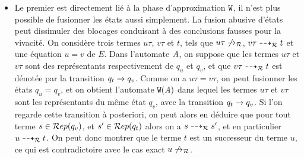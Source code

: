 \begin{itemize}
\item Le premier est directement lié à la phase d'approximation $\mathtt{W}$,
  il n'est plus possible de fusionner les états aussi simplement.
  La fusion abusive d'états peut dissimuler des blocages conduisant à des conclusions fausses pour la vivacité.
  On considère trois termes $u\tau$, $v\tau$ et $t$, tels que $u\tau \not\rightarrow_\mathcal R$, $v\tau \dashrightarrow_\mathcal R t$ et 
  une équation $u = v$ de $E$.
  Dans l'automate $\mathit A$, on suppose que les termes $u\tau$ et $v\tau$ sont des représentants respectivement de $q_u$ et $q_v$,
  et que $v\tau \dashrightarrow_\mathcal R t$ est dénotée par la transition $q_t \rightarrow q_v$. Comme on a $u\tau = v\tau$, 
  on peut fusionner les états $q_u = q_v$, et on obtient l'automate $\mathtt{W}(\mathit A)$ dans lequel les termes
  $u\tau$ et $v\tau$ sont les représentants du même état $q_v$,
  avec la transition $q_t \rightarrow q_v$. Si l'on regarde cette transition à posteriori, on peut alors en déduire
  que pour tout terme $s \in \mathcal R ep(q_v)$, et $s' \in \mathcal R ep(q_t)$ alors on a $s \dashrightarrow_\mathcal R s'$, et
  en particulier $u \dashrightarrow_\mathcal R t$. On peut donc montrer que le terme $t$ est un successeur du terme
  $u$, ce qui est contradictoire avec le cas exact $u \not\rightarrow_\mathcal R$.


\end{itemize}
